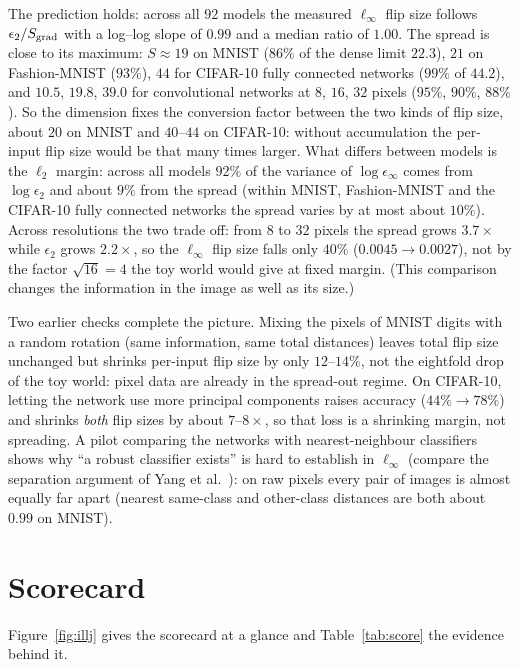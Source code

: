 \documentclass[11pt]{article}
\begin{document}
The prediction holds: across all $92$ models the measured $\ell_\infty$ flip size follows $\epsilon_2/S_{\rm grad}$ with a log--log slope of $0.99$ and a median ratio of $1.00$. The spread is close to its maximum: $S\approx19$ on MNIST ($86\%$ of the dense limit $22.3$), $21$ on Fashion-MNIST ($93\%$), $44$ for CIFAR-10 fully connected networks ($99\%$ of $44.2$), and $10.5$, $19.8$, $39.0$ for convolutional networks at $8$, $16$, $32$ pixels ($95\%$, $90\%$, $88\%$). So the dimension fixes the conversion factor between the two kinds of flip size, about $20$ on MNIST and $40$--$44$ on CIFAR-10: without accumulation the per-input flip size would be that many times larger. What differs between models is the $\ell_2$ margin: across all models $92\%$ of the variance of $\log\epsilon_\infty$ comes from $\log\epsilon_2$ and about $9\%$ from the spread (within MNIST, Fashion-MNIST and the CIFAR-10 fully connected networks the spread varies by at most about $10\%$). Across resolutions the two trade off: from $8$ to $32$ pixels the spread grows $3.7\times$ while $\epsilon_2$ grows $2.2\times$, so the $\ell_\infty$ flip size falls only $40\%$ ($0.0045\to0.0027$), not by the factor $\sqrt{16}=4$ the toy world would give at fixed margin. (This comparison changes the information in the image as well as its size.)

Two earlier checks complete the picture. Mixing the pixels of MNIST digits with a random rotation (same information, same total distances) leaves total flip size unchanged but shrinks per-input flip size by only $12$--$14\%$, not the eightfold drop of the toy world: pixel data are already in the spread-out regime. On CIFAR-10, letting the network use more principal components raises accuracy ($44\%\to78\%$) and shrinks \emph{both} flip sizes by about $7$--$8\times$, so that loss is a shrinking margin, not spreading. A pilot comparing the networks with nearest-neighbour classifiers shows why ``a robust classifier exists'' is hard to establish in $\ell_\infty$ (compare the separation argument of Yang et al.~\cite{yang2020}): on raw pixels every pair of images is almost equally far apart (nearest same-class and other-class distances are both about $0.99$ on MNIST).

\section{Scorecard}
\label{sec:score}

Figure~\ref{fig:illj} gives the scorecard at a glance and Table~\ref{tab:score} the evidence behind it.
\end{document}
